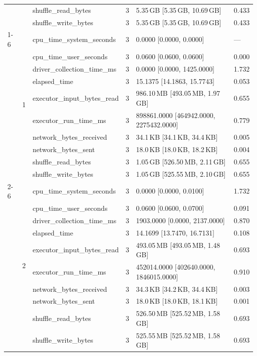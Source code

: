 \begin{tabular}{lllrll}
 &  & shuffle_read_bytes & 3 & 5.35\,GB [5.35\,GB, 10.69\,GB] & 0.433 \\
 &  & shuffle_write_bytes & 3 & 5.35\,GB [5.35\,GB, 10.69\,GB] & 0.433 \\
\cline{1-6} \cline{2-6}
\multirow[t]{30}{*}{national-scale-spatial-join-databricks-broadcast-16-nodes-small} & \multirow[t]{10}{*}{1} & cpu_time_system_seconds & 3 & 0.0000 [0.0000, 0.0000] & --- \\
 &  & cpu_time_user_seconds & 3 & 0.0600 [0.0600, 0.0600] & 0.000 \\
 &  & driver_collection_time_ms & 3 & 0.0000 [0.0000, 1425.0000] & 1.732 \\
 &  & elapsed_time & 3 & 15.1375 [14.1863, 15.7743] & 0.053 \\
 &  & executor_input_bytes_read & 3 & 986.10\,MB [493.05\,MB, 1.97\,GB] & 0.655 \\
 &  & executor_run_time_ms & 3 & 898861.0000 [464942.0000, 2275432.0000] & 0.779 \\
 &  & network_bytes_received & 3 & 34.1\,KB [34.1\,KB, 34.4\,KB] & 0.005 \\
 &  & network_bytes_sent & 3 & 18.0\,KB [18.0\,KB, 18.2\,KB] & 0.004 \\
 &  & shuffle_read_bytes & 3 & 1.05\,GB [526.50\,MB, 2.11\,GB] & 0.655 \\
 &  & shuffle_write_bytes & 3 & 1.05\,GB [525.55\,MB, 2.10\,GB] & 0.655 \\
\cline{2-6}
 & \multirow[t]{10}{*}{2} & cpu_time_system_seconds & 3 & 0.0000 [0.0000, 0.0100] & 1.732 \\
 &  & cpu_time_user_seconds & 3 & 0.0600 [0.0600, 0.0700] & 0.091 \\
 &  & driver_collection_time_ms & 3 & 1903.0000 [0.0000, 2137.0000] & 0.870 \\
 &  & elapsed_time & 3 & 14.1699 [13.7470, 16.7131] & 0.108 \\
 &  & executor_input_bytes_read & 3 & 493.05\,MB [493.05\,MB, 1.48\,GB] & 0.693 \\
 &  & executor_run_time_ms & 3 & 452014.0000 [402640.0000, 1846015.0000] & 0.910 \\
 &  & network_bytes_received & 3 & 34.3\,KB [34.2\,KB, 34.4\,KB] & 0.003 \\
 &  & network_bytes_sent & 3 & 18.0\,KB [18.0\,KB, 18.1\,KB] & 0.001 \\
 &  & shuffle_read_bytes & 3 & 526.50\,MB [525.52\,MB, 1.58\,GB] & 0.693 \\
 &  & shuffle_write_bytes & 3 & 525.55\,MB [525.52\,MB, 1.58\,GB] & 0.693 \\

\end{tabular}
